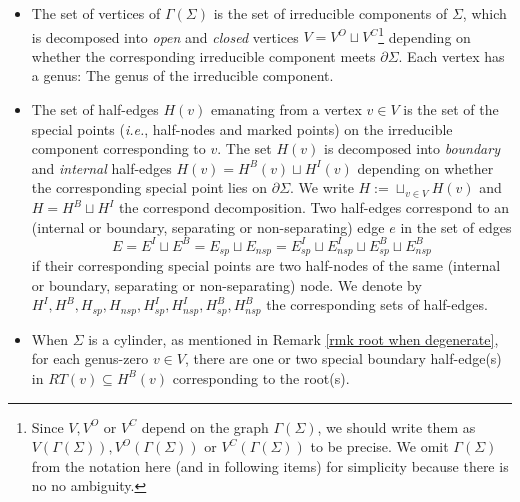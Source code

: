 \documentclass[11pt]{amsart}
\theoremstyle{definition}
\theoremstyle{remark}
\newcommand{\<}{\left<}
\renewcommand{\>}{\right>}
\numberwithin{equation}{section}
\begin{document}
\begin{itemize}
\item The %
set of vertices of $\Gamma(\Sigma)$ is the set of irreducible components of $\Sigma$, which is decomposed into \textit{open} and \textit{closed} vertices  $V = V^O \sqcup V^C$\footnote{Since $V,V^O$ or $V^C$ depend on the graph $\Gamma(\Sigma)$, we should write them as $V(\Gamma(\Sigma)),V^O(\Gamma(\Sigma))$ or $V^C(\Gamma(\Sigma))$ to be precise. We omit $\Gamma(\Sigma)$ from the notation here (and in following items) for simplicity because there is no no ambiguity.} depending on whether the corresponding irreducible component meets $\partial \Sigma$. 
Each vertex has a %
genus: The genus %
of the irreducible component.

\item The set of half-edges $H(v)$ emanating from a vertex $v\in V$ is the set of the special points %
(\textit{i.e.}, half-nodes %
and marked points) on the irreducible component corresponding to $v$. The set $H(v)$ is decomposed into \textit{boundary} and \textit{internal} half-edges $H(v) = H^B(v) \sqcup H^I(v)$ depending on whether the corresponding special point lies on $\partial \Sigma$. We write $H:=\sqcup_{v\in V}H(v)$ and $H = H^B \sqcup H^I$ the correspond decomposition. Two half-edges correspond to an (internal or boundary, separating or non-separating) edge $e$ in the set of %
edges $$E=E^I\sqcup E^B=E_{sp}\sqcup E_{nsp}=E^I_{sp}\sqcup E^I_{nsp}\sqcup E^B_{sp}\sqcup E^B_{nsp}$$ if %
their corresponding special points are two half-nodes of the same (internal or boundary, separating or non-separating) node.  We denote by $H^I,H^B,H_{sp},H_{nsp},H^I_{sp},H^I_{nsp},H^B_{sp},H^B_{nsp}$ the corresponding sets of half-edges.

\item
When $\Sigma$ is a cylinder, as mentioned in Remark \ref{rmk root when degenerate}, for each genus-zero $v \in V$, there are one or two special boundary half-edge(s) in $RT(v)\subseteq H^B(v)$ corresponding to the root(s). 


\end{itemize}
\end{document}
